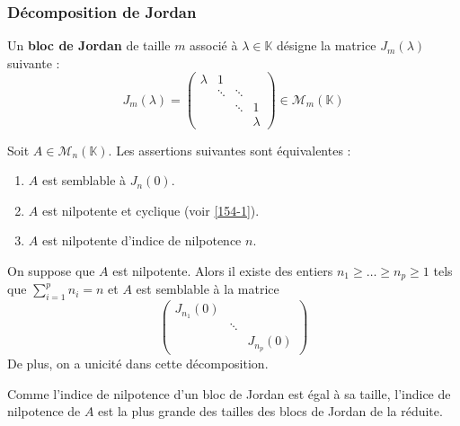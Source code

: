   \subsubsection{Décomposition de Jordan}


  \begin{definition}
    Un \textbf{bloc de Jordan} de taille $m$ associé à $\lambda \in \mathbb{K}$ désigne la matrice $J_m(\lambda)$ suivante :
    \[ J_m(\lambda) = \begin{pmatrix} \lambda & 1 & \\ & \ddots & \ddots & \\ & & \ddots & 1 \\ & & & \lambda \end{pmatrix} \in \mathcal{M}_m(\mathbb{K}) \]
  \end{definition}

  \begin{proposition}
    Soit $A \in \mathcal{M}_n(\mathbb{K})$. Les assertions suivantes sont équivalentes :
    \begin{enumerate}[label={\bfseries(\roman*)}]
      \item $A$ est semblable à $J_n(0)$.
      \item $A$ est nilpotente et cyclique (voir \cref{154-1}).
      \item $A$ est nilpotente d'indice de nilpotence $n$.
    \end{enumerate}
  \end{proposition}

  \begin{theorem}
    On suppose que $A$ est nilpotente. Alors il existe des entiers $n_1 \geq \dots \geq n_p \geq 1$ tels que $\sum_{i=1}^p n_i=n$ et $A$ est semblable à la matrice
    \[ \begin{pmatrix} J_{n_1}(0) & & \\ & \ddots & \\ & & J_{n_p}(0) \end{pmatrix} \]
    De plus, on a unicité dans cette décomposition.
  \end{theorem}

  \begin{remark}
    Comme l'indice de nilpotence d'un bloc de Jordan est égal à sa taille, l'indice de nilpotence de $A$ est la plus grande des tailles des blocs de Jordan de la réduite.
  \end{remark}

